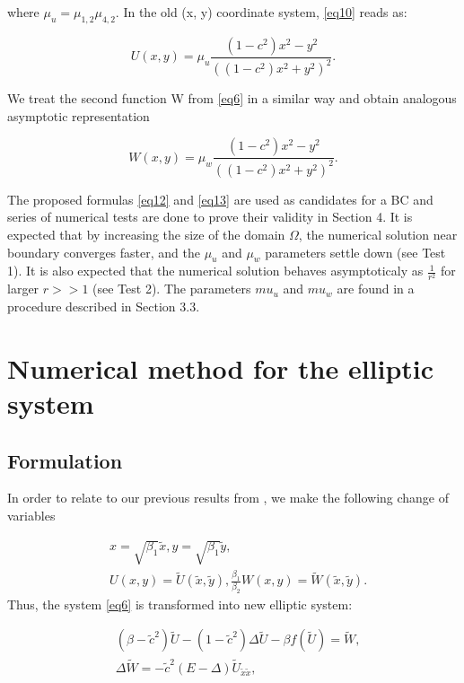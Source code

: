 \documentclass[12pt]{article}
\theoremstyle{theorem}
\theoremstyle{defi}
\begin{document}
where $\mu_u = \mu_{1,2} \mu_{4,2}$. In the old (x, y) coordinate system, \eqref{eq10}  reads as:

\begin{equation}
U(x,y) = \mu_u \frac{(1-c^2)x^2 - y^2}{ ( (1-c^2)x^2 + y^2 )^2 }. \label{eq12}
\end{equation}

We treat the second function W from \eqref{eq6}  in a similar way and obtain analogous asymptotic representation

\begin{equation}
W(x,y) = \mu_w \frac{(1-c^2)x^2 - y^2}{ ( (1-c^2)x^2 + y^2 )^2 }. \label{eq13}
\end{equation}

The proposed formulas \eqref{eq12} and \eqref{eq13} are used as candidates for a BC and series of numerical tests are done to prove their validity in Section 4. 
It is expected that by increasing the size of the domain $\Omega$, the numerical solution near boundary converges faster, and the $\mu_u$ and $\mu_w$ parameters settle down (see Test 1). It is also expected that the numerical solution behaves asymptoticaly as $\frac{1}{r^2}$ for larger $r >> 1$ (see Test 2). The parameters $mu_u$ and $mu_w$ are found in a procedure described in Section 3.3.

\section{Numerical method for the elliptic system}

\subsection{Formulation}


In order to relate to our previous results from \cite{ref14, ref15}, we make the following change of variables

\begin{equation}\label{eqVCN}
\begin{split}
&x=\sqrt{\beta_1} { \tilde{x} }, y=\sqrt{\beta_1} { \tilde{ y} },\\
&U(x,y)= \tilde U({ \tilde{x} },{ \tilde{y} } ), \frac{\beta_1}{\beta_2} W(x,y)=  \tilde W({ \tilde{x} },{ \tilde{y} } ).
\end{split}
\end{equation}
Thus, the system \eqref{eq6} is transformed into new elliptic system:

\begin{equation}\label{eq31}
\begin{split}
&(\beta-\tilde c ^2) \tilde U  -(1- \tilde c^2) \Delta \tilde U - \beta f( \tilde U ) = \tilde W, \\
&\Delta \tilde W =  - \tilde c^2 (E- \Delta) \tilde U_{\tilde x \tilde x},
\end{split}
\end{equation}
\end{document}
